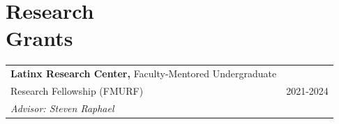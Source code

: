 \section{\sc Research \\ Grants}

\begin{tabular}{@{}p{4.25in}p{2in}}
\textbf{Latinx Research Center,} Faculty-Mentored Undergraduate \\ Research Fellowship (FMURF) & 2021-2024 \\
\textit{Advisor: Steven Raphael} \\

\end{tabular}
\endinput


